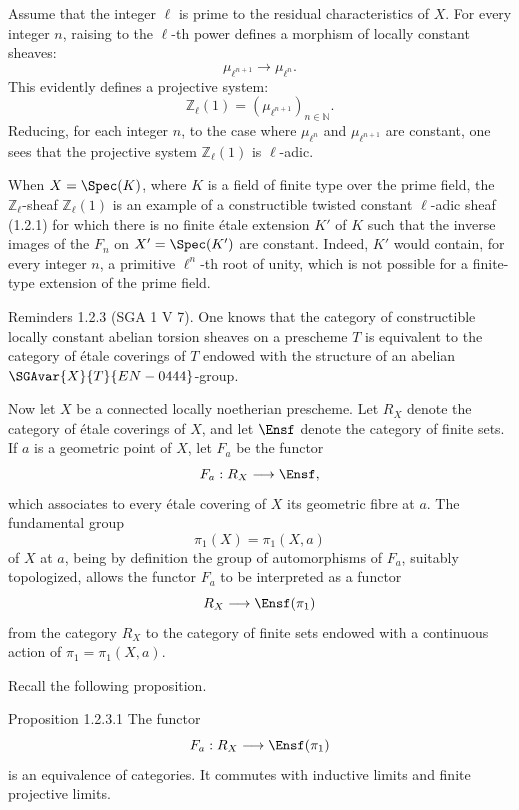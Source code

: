 Assume that the integer \(\ell\) is prime to the residual characteristics of \(X\). For every integer \(n\), raising to the \(\ell\)-th power defines a morphism of locally constant sheaves:
\[
\mu_{\ell^{n+1}}\longrightarrow \mu_{\ell^n}.
\]
This evidently defines a projective system:
\[
\mathbb Z_\ell(1)=(\mu_{\ell^{n+1}})_{n\in\mathbb N}.
\]
Reducing, for each integer \(n\), to the case where \(\mu_{\ell^n}\) and \(\mu_{\ell^{n+1}}\) are constant, one sees that the projective system \(\mathbb Z_\ell(1)\) is \(\ell\)-adic.

When \(X=\Spec(K)\), where \(K\) is a field of finite type over the prime field, the \(\mathbb Z_\ell\)-sheaf \(\mathbb Z_\ell(1)\) is an example of a constructible twisted constant \(\ell\)-adic sheaf (1.2.1) for which there is no finite étale extension \(K'\) of \(K\) such that the inverse images of the \(F_n\) on \(X'=\Spec(K')\) are constant. Indeed, \(K'\) would contain, for every integer \(n\), a primitive \(\ell^n\)-th root of unity, which is not possible for a finite-type extension of the prime field.

\begin{statement}{Reminders 1.2.3}
(SGA 1 V 7). One knows that the category of constructible locally constant abelian torsion sheaves on a prescheme \(T\) is equivalent to the category of étale coverings of \(T\) endowed with the structure of an abelian \(\SGAvar{X}{T}{EN-0444}\)-group.
\end{statement}

Now let \(X\) be a connected locally noetherian prescheme. Let \(R_X\) denote the category of étale coverings of \(X\), and let \(\Ensf\) denote the category of finite sets. If \(a\) is a geometric point of \(X\), let \(F_a\) be the functor
\[
F_a:R_X\longrightarrow \Ensf,
\]
which associates to every étale covering of \(X\) its geometric fibre at \(a\). The fundamental group
\[
\pi_1(X)=\pi_1(X,a)
\]
of \(X\) at \(a\), being by definition the group of automorphisms of \(F_a\), suitably topologized, allows the functor \(F_a\) to be interpreted as a functor
\[
R_X\longrightarrow \Ensf(\pi_1)
\]
from the category \(R_X\) to the category of finite sets endowed with a continuous action of \(\pi_1=\pi_1(X,a)\).

Recall the following proposition.

\begin{statement}{Proposition 1.2.3.1}
The functor
\[
F_a:R_X\longrightarrow \Ensf(\pi_1)
\]
is an equivalence of categories. It commutes with inductive limits and finite projective limits.
\end{statement}

